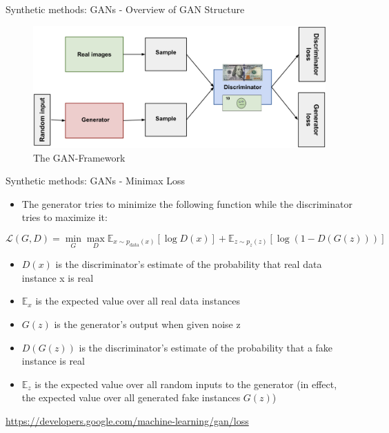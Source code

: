 \documentclass[
	aspectratio = 169
 ]{beamer}
\begin{document}
\begin{frame}{Synthetic methods: GANs - Overview of GAN Structure}

\begin{figure}
    \centering
    \includegraphics[width=0.9\linewidth
                    ]{gallery/gan-structure.png}
    \caption{The GAN-Framework}
\end{figure}

\end{frame}
\begin{frame}{Synthetic methods: GANs - Minimax Loss}

	\begin{itemize}
		\item The generator tries to minimize the following function while the discriminator tries to maximize it:
	\end{itemize}
	\[
	\mathcal{L}(G, D) = \min_G \max_D \mathbb{E}_{x \sim p_{\text{data}}(x)} [\log D(x)] + \mathbb{E}_{z \sim p_z(z)} [\log(1 - D(G(z)))]
	\]
	\begin{itemize}
		\item \(D(x)\) is the discriminator's estimate of the probability that real data instance x is real
		\item \(\mathbb{E}_x\) is the expected value over all real data instances
		\item \(G(z)\) is the generator's output when given noise z
		\item \(D(G(z))\) is the discriminator's estimate of the probability that a fake instance is real
		\item \(\mathbb{E}_z\) is the expected value over all random inputs to the generator (in effect, the expected value over all generated fake instances \(G(z)\))
	\end{itemize}
	\vspace{5mm}
	\tiny{\url{https://developers.google.com/machine-learning/gan/loss}}
 
\end{frame}
\end{document}
